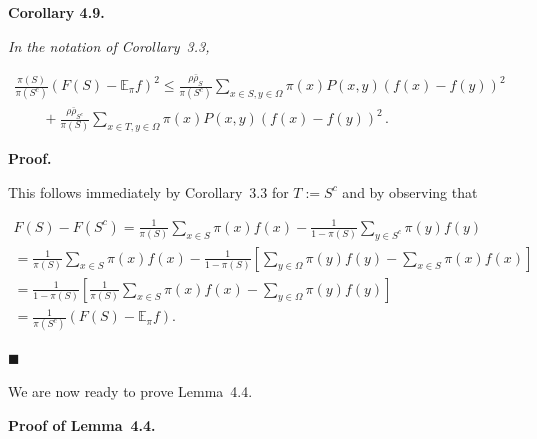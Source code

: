 \documentclass[10pt,a4paper]{article}
\begin{document}


\par\medskip\noindent\textbf{\textbf{Corollary 4.9}\textbf{.}}\par



\emph{In the notation of Corollary 3.3,}\par


\[\begin{gathered}
\displaystyle\frac{\pi(S)}{\pi(S^{c})}(F(S)-\mathbb{E}_{\pi}f)^{2} \displaystyle\leq\frac{\rho\bar{\rho}_{S}}{\pi(S^{c})}\sum_{x\in S,y\in\Omega}\pi(x)P(x,y)(f(x)-f(y))^{2} \\
\displaystyle\quad\quad+\frac{\rho\bar{\rho}_{S^{c}}}{\pi(S)}\sum_{x\in T,y\in\Omega}\pi(x)P(x,y)(f(x)-f(y))^{2}\,.
\end{gathered}\]






\par\medskip\noindent\textbf{Proof.}\par



This follows immediately by Corollary 3.3 for $T:=S^{c}$ and by observing that\par


\[\begin{gathered}
\displaystyle F(S)-F(S^{c}) \displaystyle=\frac{1}{\pi(S)}\sum_{x\in S}\pi(x)f(x)-\frac{1}{1-\pi(S)}\sum_{y\in S^{c}}\pi(y)f(y) \\
\displaystyle=\frac{1}{\pi(S)}\sum_{x\in S}\pi(x)f(x)-\frac{1}{1-\pi(S)}\left[\sum_{y\in\Omega}\pi(y)f(y)-\sum_{x\in S}\pi(x)f(x)\right] \\
\displaystyle=\frac{1}{1-\pi(S)}\left[\frac{1}{\pi(S)}\sum_{x\in S}\pi(x)f(x)-\sum_{y\in\Omega}\pi(y)f(y)\right] \\
\displaystyle=\frac{1}{\pi(S^{c})}(F(S)-\mathbb{E}_{\pi}f).
\end{gathered}\]


\ensuremath{\blacksquare}\par





We are now ready to prove Lemma 4.4.\par




\par\medskip\noindent\textbf{Proof of Lemma 4.4.}\par
\end{document}
